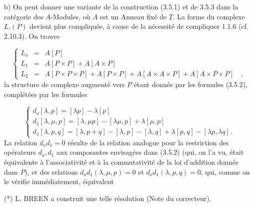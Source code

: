 b) On peut donner une variante de la construction (3.5.1) et de 3.5.3 dans la catégorie des $A$-Modules, où $A$ est un Anneau fixé de $\underline{T}$. La forme du complexe $L.(P)$ devient plus compliquée, à cause de la nécessité de compliquer 1.1.6 (cf. 2.10.3). On trouve

\begin{equation}\tag{3.5.5}
\left\{
\begin{array}{lcl}
L_o & = & A[P] \\[4pt]
L_1 & = & A[P \times P] + A[A \times P] \\[4pt]
L_2 & = & A[P \times P \times P] + A[P \times P] + A[A \times A \times P] + A[A \times P \times P] \quad ,
\end{array}
\right.
\end{equation}
la structure de complexe augmenté vers $P$ étant donnée par les formules (3.5.2), complétées par les formules

\begin{equation}\tag{3.5.6}
\left\{
\begin{array}{l}
d_o[\lambda,p] = [\lambda p] - \lambda[p] \\[4pt]
d_1[\lambda,\mu,p] = [\lambda,\mu p] - [\lambda\mu ,p] + \lambda[\mu,p] \\[4pt]
d_1[\lambda,p,q] = [\lambda,p+q] - [\lambda,p] - [\lambda,q] + \lambda[p,q] - [\lambda p,\lambda q].
\end{array}
\right.
\end{equation}
La relation $d_o d_1 = 0$ résulte de la relation analogue pour la restriction des opérateurs $d_o,d_1$ aux composantes envisagées dans (3.5.2) (qui, on l'a vu, était équivalente à l'associativité et à la commutativité de la loi d'addition donnée dans $P$), et des relations $d_o d_1(\lambda,\mu,p) = 0$ et $d_o d_1(\lambda,p,q) = 0$, qui, comme on le vérifie immédiatement, équivalent 

(*)  L. BREEN a construit une telle résolution (Note du correcteur).



